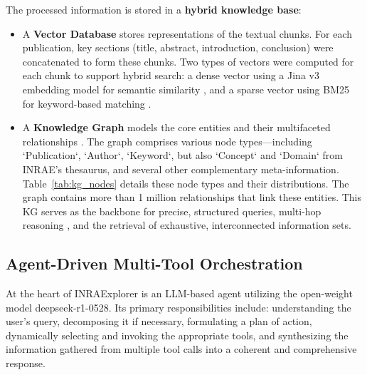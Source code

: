 \documentclass{ecai}
\begin{document}
The processed information is stored in a \textbf{hybrid knowledge base}:
\begin{itemize}
    \item A \textbf{Vector Database} stores representations of the textual chunks. For each publication, key sections (title, abstract, introduction, conclusion) were concatenated to form these chunks. Two types of vectors were computed for each chunk to support hybrid search: a dense vector using a Jina v3 embedding model for semantic similarity \citep{gunther2023jina}, and a sparse vector using BM25 for keyword-based matching \citep{robertson2009probabilisticbm25}.
    \item A \textbf{Knowledge Graph} models the core entities and their multifaceted relationships \citep{Roll2025Augmenting}. The graph comprises various node types—including `Publication`, `Author`, `Keyword`, but also `Concept` and `Domain` from INRAE's thesaurus, and several other complementary meta-information. Table~\ref{tab:kg_nodes} details these node types and their distributions. The graph contains more than 1 million relationships that link these entities. This KG serves as the backbone for precise, structured queries, multi-hop reasoning \citep{edge2024graphrag, he2024gretriever}, and the retrieval of exhaustive, interconnected information sets.
\end{itemize}


\subsection{Agent-Driven Multi-Tool Orchestration}

At the heart of INRAExplorer is an LLM-based agent utilizing the open-weight model deepseek-r1-0528. Its primary responsibilities include: understanding the user's query, decomposing it if necessary, formulating a plan of action, dynamically selecting and invoking the appropriate tools, and synthesizing the information gathered from multiple tool calls into a coherent and comprehensive response.
\end{document}
